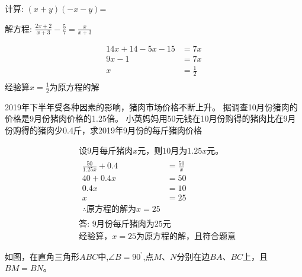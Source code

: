 \documentclass[answers]{exam} %
\newcommand\epart{\part}
\newcommand\degree{^\circ}
\begin{document}
\begin{questions}

\question
计算: $(x+y)(-x-y)$=\fillin[$-x^2-2xy-y^2$]

\question
解方程: $\frac{2x+2}{x+3}-\frac{5}{7}=\frac{x}{x+3}$

\vspace*{1in}
\begin{solution}
\[
\begin{aligned}
  14x+14-5x-15 &= 7x \\
  9x - 1 &= 7x \\
  x &= \frac{1}{2} \\
\end{aligned}
\]
经验算$x = \frac{1}{2}$为原方程的解
\end{solution}

\question
2019年下半年受各种因素的影响，猪肉市场价格不断上升。
据调查10月份猪肉的价格是9月份猪肉价格的1.25倍。
小英妈妈用50元钱在10月份购得的猪肉比在9月份购得的猪肉少0.4斤，求2019年9月份的每斤猪肉价格

\vspace*{1in}
\begin{solution}
  \[
\begin{aligned}
  & \mbox{设9月每斤猪肉$x$元，则10月为$1.25x$元。} \\
  & \begin{aligned}
  \frac{50}{1.25x}+0.4 &= \frac{50}{x} \\
  40 + 0.4x &= 50 \\
  0.4x &= 10 \\
  x &= 25 \\
  \therefore \mbox{原方程的解为} x = 25
  \end{aligned} \\
  & \mbox{答: 9月份每斤猪肉为25元} \\
  & \mbox{经验算，}x=25\mbox{为原方程的解，且符合题意}
\end{aligned}
\]
\end{solution}

\question 
如图，在直角三角形$ABC$中,$\angle B=90^{\degree}$,点$M$、$N$分别在边$BA$、$BC$上，且$BM=BN$。
  

\begin{center}
\end{center}


\end{questions}
\end{document}

